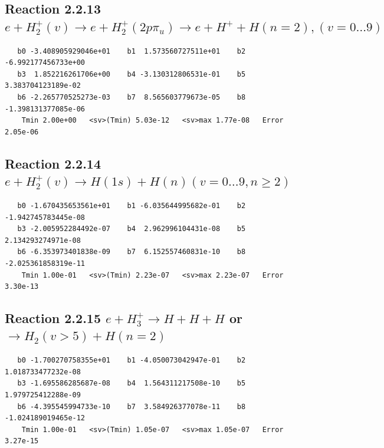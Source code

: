 \documentclass[12pt,dvipdfmx]{article}
\begin{document}
\newpage
\subsection{
Reaction 2.2.13 $ e + H_2^+(v) \rightarrow e + H_2^+(2p\pi_u) \rightarrow e + H^+ + H(n=2),  (v=0\ldots 9)$}














\begin{small}\begin{verbatim}
   b0 -3.408905929046e+01    b1  1.573560727511e+01    b2 -6.992177456733e+00
   b3  1.852216261706e+00    b4 -3.130312806531e-01    b5  3.383704123189e-02
   b6 -2.265770525273e-03    b7  8.565603779673e-05    b8 -1.398131377085e-06
    Tmin 2.00e+00   <sv>(Tmin) 5.03e-12   <sv>max 1.77e-08   Error 2.05e-06
\end{verbatim}\end{small}

\newpage
\subsection{
Reaction 2.2.14 $  e + H_2^+(v) \rightarrow H(1s) + H(n)   (v=0\ldots 9, n \geq 2)$}


\begin{small}\begin{verbatim}
   b0 -1.670435653561e+01    b1 -6.035644995682e-01    b2 -1.942745783445e-08
   b3 -2.005952284492e-07    b4  2.962996104431e-08    b5  2.134293274971e-08
   b6 -6.353973401838e-09    b7  6.152557460831e-10    b8 -2.025361858319e-11
    Tmin 1.00e-01   <sv>(Tmin) 2.23e-07   <sv>max 2.23e-07   Error 3.30e-13
\end{verbatim}\end{small}

\newpage
\subsection{
Reaction 2.2.15 $  e + H_3^+ \rightarrow H + H + H$ or $\rightarrow H_2(v > 5) + H(n=2)$}


\begin{small}\begin{verbatim}
   b0 -1.700270758355e+01    b1 -4.050073042947e-01    b2  1.018733477232e-08
   b3 -1.695586285687e-08    b4  1.564311217508e-10    b5  1.979725412288e-09
   b6 -4.395545994733e-10    b7  3.584926377078e-11    b8 -1.024189019465e-12
    Tmin 1.00e-01   <sv>(Tmin) 1.05e-07   <sv>max 1.05e-07   Error 3.27e-15
\end{verbatim}\end{small}
\end{document}
